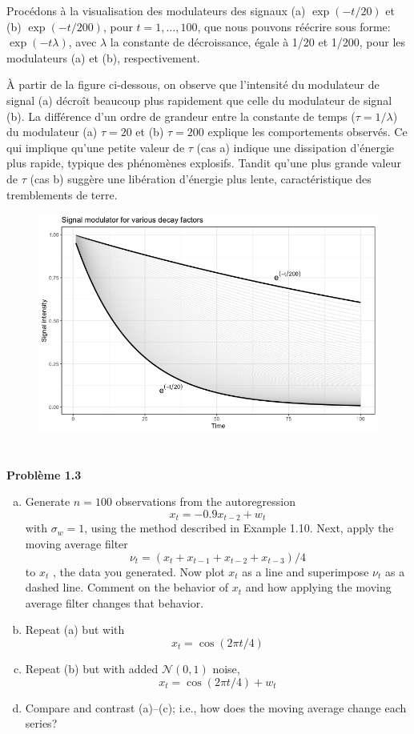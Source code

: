 \documentclass{homework}
\begin{document}
Procédons à la visualisation des modulateurs des signaux (a) $\exp(-t / 20)$ et (b) $\exp(-t / 200)$, pour $t = 1, \dots, 100$, que nous pouvons réécrire sous forme: $\exp(-t\lambda)$, avec $\lambda$ la constante de décroissance, égale à 1/20 et 1/200, pour les modulateurs (a) et (b), respectivement.

À partir de la figure ci-dessous, on observe que l'intensité du modulateur de signal (a) décroît beaucoup plus rapidement que celle du modulateur de signal (b). La différence d'un ordre de grandeur entre la constante de temps ($\tau = 1/\lambda$) du modulateur (a) $\tau = 20$ et (b) $\tau = 200$ explique les comportements observés. Ce qui implique qu'une petite valeur de $\tau$ (cas a) indique une dissipation d'énergie plus rapide, typique des phénomènes explosifs. Tandit qu'une plus grande valeur de $\tau$ (cas b) suggère une libération d'énergie plus lente, caractéristique des tremblements de terre.

\begin{figure}
    \centering
    \includegraphics[width=1\linewidth]{figure1.2c.png}
\end{figure}
\newpage
\empty
\section*{}
\newpage
\textbf{\Large{Problème 1.3}}

\begin{enumerate}[(a)]
    \item Generate $n = 100$ observations from the autoregression $$x_t = -0.9x_{t-2} + w_t$$ with $\sigma_w = 1$, using the method described in Example 1.10. Next, apply the moving average filter $$\nu_t = (x_t + x_{t-1} + x_{t-2} + x_{t-3})/4$$ to $x_t$ , the data you generated. Now plot $x_t$ as a line and superimpose $\nu_t$ as a dashed line. Comment on the behavior of $x_t$ and how applying the moving average filter changes that behavior.
    \item Repeat (a) but with $$x_t = \cos(2 \pi t/4)$$
    \item Repeat (b) but with added $\mathcal{N}(0, 1)$ noise, $$x_t = \cos(2 \pi t/4) + w_t$$
    \item Compare and contrast (a)–(c); i.e., how does the moving average change each series?
\end{enumerate}
\end{document}
